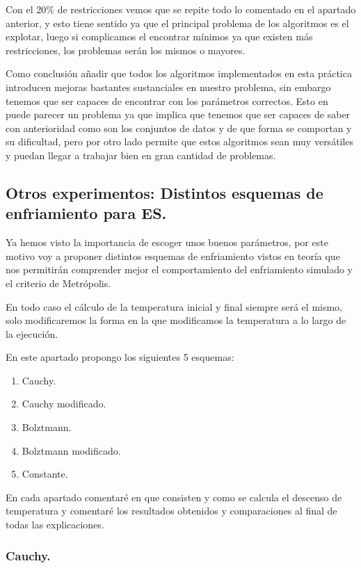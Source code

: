 \documentclass[12pt, spanish]{article}
\begin{document}
Con el 20\% de restricciones vemos que se repite todo lo comentado en el apartado anterior, y esto tiene sentido ya que el principal problema de los algoritmos es el explotar, luego si complicamos el encontrar mínimos ya que existen más restricciones, los problemas serán los mismos o mayores.


Como conclusión añadir que todos los algoritmos implementados en esta práctica introducen mejoras bastantes sustanciales en nuestro problema, sin embargo tenemos que ser capaces de encontrar con los parámetros correctos. Esto en puede parecer un problema ya que implica que tenemos que ser capaces de saber con anterioridad como son los conjuntos de datos y de que forma se comportan y su dificultad, pero por otro lado permite que estos algoritmos sean muy versátiles y puedan llegar a trabajar bien en gran cantidad de problemas.

\subsection{Otros experimentos: Distintos esquemas de enfriamiento para ES.}

Ya hemos visto la importancia de escoger unos buenos parámetros, por este motivo voy a proponer distintos esquemas de enfriamiento vistos en teoría que nos permitirán comprender mejor el comportamiento del enfriamiento simulado y el criterio de Metrópolis.

En todo caso el cálculo de la temperatura inicial y final siempre será el mismo, solo modificaremos la forma en la que modificamos la temperatura a lo largo de la ejecución.

En este apartado propongo los siguientes 5 esquemas:

\begin{enumerate}
	\item Cauchy.
	\item Cauchy modificado.
	\item Bolztmann.
	\item Bolztmann modificado.
	\item Constante.
\end{enumerate}

En cada apartado comentaré en que consisten y como se calcula el descenso de temperatura y comentaré los resultados obtenidos y comparaciones al final de todas las explicaciones.

\subsubsection{Cauchy.}
\end{document}

